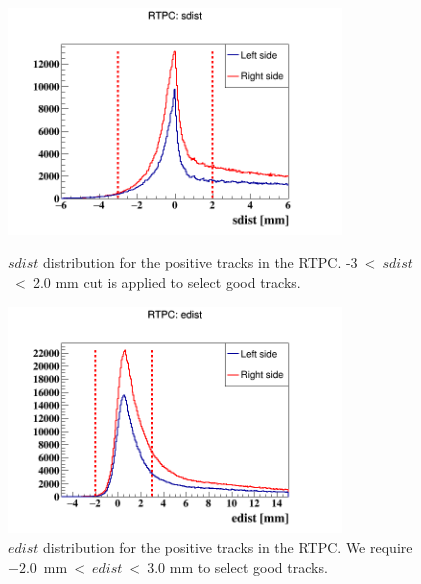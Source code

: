 \begin{itemize}
\begin{figure}[tbp]
\vspace{-0.3in}
\begin{minipage}[c]{.46\linewidth}
\hspace{-0.3in}
\includegraphics[height=6.0cm]{fig_analysis/rtpc_sdist.png}
\caption{$sdist$ distribution for the positive tracks in the RTPC.  
-3~<~$sdist$~<~2.0 mm cut is applied to select good tracks.} 
\label{fig:rtpc_sdist}
\end{minipage} \hfill
\begin{minipage}[c]{.46\linewidth}
\hspace{-0.3in}
\includegraphics[height=6.0cm]{fig_analysis/rtpc_edist.png}
\caption{$edist$ distribution for the positive tracks in the RTPC. We require 
$-2.0$~mm~<~$edist$~<~3.0 mm to select good tracks.}
\label{fig:rtpc_edist}
\end{minipage}
\end{figure}


\end{itemize}
